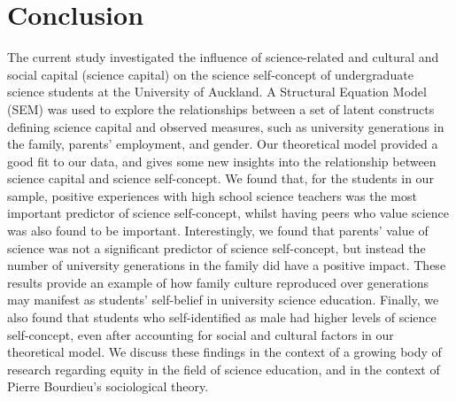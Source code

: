 \section*{Conclusion}
The current study investigated the influence of science-related and cultural and social capital (science capital) on the science self-concept of undergraduate science students at the University of Auckland. A Structural Equation Model (SEM) was used to explore the relationships between a set of latent constructs defining science capital and observed measures, such as university generations in the family, parents' employment, and gender. Our theoretical model provided a good fit to our data, and gives some new insights into the relationship between science capital and science self-concept. We found that, for the students in our sample, positive experiences with high school science teachers was the most important predictor of science self-concept, whilst having peers who value science was also found to be important. Interestingly, we found that parents' value of science was not a significant predictor of science self-concept, but instead the number of university generations in the family did have a positive impact. These results provide an example of how family culture reproduced over generations may manifest as students' self-belief in university science education. Finally, we also found that students who self-identified as male had higher levels of science self-concept, even after accounting for social and cultural factors in our theoretical model. We discuss these findings in the context of a growing body of research regarding equity in the field of science education, and in the context of Pierre Bourdieu's sociological theory.  





